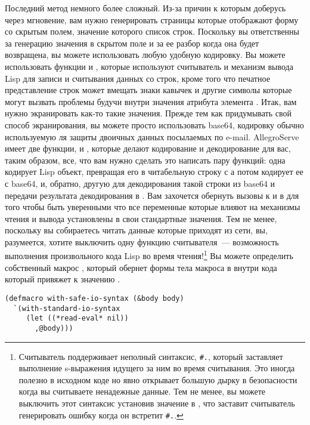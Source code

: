 Последний  метод немного более сложный. Из-за причин к которым доберусь
через мгновение, вам нужно генерировать страницы которые отображают форму со скрытым
полем, значение которого список строк. Поскольку вы ответственны за генерацию значения в
скрытом поле и за ее разбор когда она будет возвращена, вы можете использовать любую
удобную кодировку. Вы можете использовать функции  и
, которые используют считыватель и механизм вывода Lisp для записи
и считывания данных со строк, кроме того что печатное представление строк может вмещать
знаки кавычек и другие символы которые могут вызвать проблемы будучи внутри значения
атрибута элемента . Итак, вам нужно экранировать как-то такие значения. Прежде
тем как придумывать свой способ экранирования, вы можете просто использовать base64,
кодировку обычно используемую ля защиты двоичных данных посылаемых по e-mail. AllegroServe
имеет две функции,  и , которые делают кодирование
и декодирование для вас, таким образом, все, что вам нужно сделать это написать пару
функций: одна кодирует Lisp объект, превращая его в читабельную строку с
 а потом кодирует ее с base64, и, обратно, другую для декодирования
такой строки из base64 и передачи результата декодирования в . Вам
захочется обернуть вызовы к  и  в
 для того чтобы быть уверенными что все переменные которые
влияют на механизмы чтения и вывода установлены в свои стандартные значения. Тем не менее,
поскольку вы собираетесь читать данные которые приходят из сети, вы, разумеется, хотите
выключить одну функцию считывателя~--- возможность выполнения произвольного кода Lisp во
время чтения!\footnote{Считыватель поддерживает неполный синтаксис, \lstinline!#.!,
который заставляет выполнение s-выражения идущего за ним во время считывания. Это иногда
полезно в исходном коде но явно открывает большую дырку в безопасности когда вы считываете
ненадежные данные. Тем не менее, вы можете выключить этот синтаксис установив значение
 в , что заставит считыватель генерировать ошибку когда он
встретит \lstinline!#.!.} Вы можете определить собственный макрос
, который обернет формы тела макроса в
 внутри кода  который привяжет  к
значению .

\begin{lstlisting}
(defmacro with-safe-io-syntax (&body body)
  `(with-standard-io-syntax
     (let ((*read-eval* nil))
       ,@body)))
\end{lstlisting}

